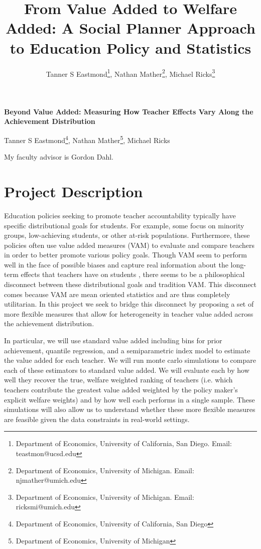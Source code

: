 \documentclass[letterpaper,12pt]{article}
\title{From Value Added to Welfare Added: A Social Planner Approach to Education Policy and Statistics}
\author{
Tanner S Eastmond\thanks{Department of Economics, University of California, San Diego. Email: teastmon@ucsd.edu}, Nathan Mather\thanks{Department of Economics, University of Michigan. Email: njmather@umich.edu }, Michael Ricks\thanks{Department of Economics, University of Michigan. Email: ricksmi@umich.edu}}
\date{\vspace{-8ex}}
\begin{document}
\begin{center}
\noindent \textbf{Beyond Value Added: Measuring How Teacher Effects Vary Along the Achievement Distribution}

Tanner S Eastmond\footnote{Department of Economics, University of California, San Diego}, Nathan Mather\footnote{\label{1}Department of Economics, University of Michigan}, Michael Ricks\footnotemark[\ref{1}]
\end{center}





\noindent My faculty advisor is Gordon Dahl.





\section{Project Description}

Education policies seeking to promote teacher accountability typically have specific distributional goals for students. For example, some focus on minority groups, low-achieving students, or other at-risk populations. Furthermore, these policies often use value added measures (VAM) to evaluate and compare teachers in order to better promote various policy goals. Though VAM seem to perform well in the face of possible biases and capture real information about the long-term effects that teachers have on students \citep{chetty2014measuring1, chetty2014measuring2}, there seems to be a philosophical disconnect between these distributional goals and tradition VAM. This disconnect comes because VAM are mean oriented statistics and are thus completely utilitarian. In this project we seek to bridge this disconnect by proposing a set of more flexible measures that allow for heterogeneity in teacher value added across the achievement distribution.

In particular, we will use standard value added including bins for prior achievement, quantile regression, and a semiparametric index model to estimate the value added for each teacher. We will run monte carlo simulations to compare each of these estimators to standard value added. We will evaluate each by how well they recover the true, welfare weighted ranking of teachers (i.e. which teachers contribute the greatest value added weighted by the policy maker's explicit welfare weights) and by how well each performs in a single sample. These simulations will also allow us to understand whether these more flexible measures are feasible given the data constraints in real-world settings.
\end{document}
